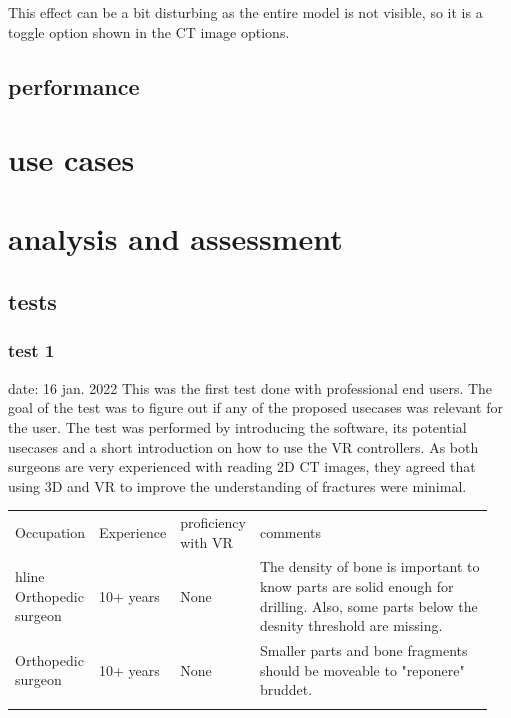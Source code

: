 \documentclass[a4paper]{report}
\begin{document}
This effect can be a bit disturbing as the entire model is not visible, so it is a toggle option shown in the CT image options.

\section{performance}

\chapter{use cases}\label{usecases}

\chapter{analysis and assessment}\label{analysis and assessment}

\section{tests}


\subsection{test 1}
date: 16 jan. 2022
This was the first test done with professional end users. The goal of the test was to figure out if any of the proposed usecases was relevant for the user. The test was performed by introducing the software, its potential usecases and a short introduction on how to use the VR controllers.
As both surgeons are very experienced with reading 2D CT images, they agreed that using 3D and VR to improve the understanding of fractures were minimal.

\begin{table}[ht]
\begin{tabular}{p{0.15\linewidth} |p{0.15\linewidth} |p{0.15\linewidth} | p{0.5\linewidth}}
Occupation         & Experience & proficiency with VR & comments                                                                                                                                \\hline
Orthopedic surgeon & 10+ years  & None                & The density of bone is important to know parts are solid enough for drilling. Also, some parts below the desnity threshold are missing. \\
Orthopedic surgeon & 10+ years  & None                & Smaller parts and bone fragments should be moveable to "reponere" bruddet.                                                              \\
                   &            &                     &
\end{tabular}
\end{table}
\end{document}
